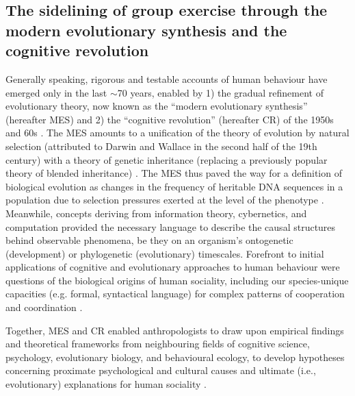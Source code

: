 \begin{CJK}{UTF8}{gbsn}
\subsection{The sidelining of group exercise through the modern evolutionary synthesis and the cognitive revolution}

Generally speaking, rigorous and testable accounts of human behaviour have emerged only in the last $\sim$70 years,  enabled by 1) the gradual refinement of evolutionary theory, now known as the ``modern evolutionary synthesis'' (hereafter MES) and 2) the ``cognitive revolution'' (hereafter CR) of the 1950s and 60s \citep{Laland2010}.  The MES amounts to a unification of the theory of evolution by natural selection (attributed to Darwin and Wallace in the second half of the 19th century) with a theory of genetic inheritance (replacing a previously popular theory of blended inheritance) \citep{Calcott2013}.  The MES thus paved the way for a definition of biological evolution as changes in the frequency of heritable DNA sequences in a population due to selection pressures exerted at the level of the phenotype \citep{Grafen1984}.  Meanwhile, concepts deriving from information theory, cybernetics, and computation provided the necessary language to describe the causal structures behind observable phenomena, be they on an organism's ontogenetic (development) or phylogenetic (evolutionary) timescales.  Forefront to initial applications of cognitive and evolutionary approaches to human behaviour were questions of the biological origins of human sociality, including our species-unique capacities (e.g. formal, syntactical language) for complex patterns of cooperation and coordination \citep{Wilson1975,Chomsky1965}.

Together, MES and CR enabled anthropologists to draw upon empirical findings and theoretical frameworks from neighbouring fields of cognitive science, psychology, evolutionary biology, and behavioural ecology, to develop hypotheses concerning proximate psychological and cultural causes and ultimate (i.e., evolutionary) explanations for human sociality \cite[e.g.][see Appendix ~\ref{app1:intro} Section ~\ref{sect:modernSynthesis} for a more detailed explanation of MS, CR, and their applications to human behaviour)]{Dawkins1976,Wilson1978,Sperber1996,Whitehouse2004,Dunbar1996}.


\end{CJK}
